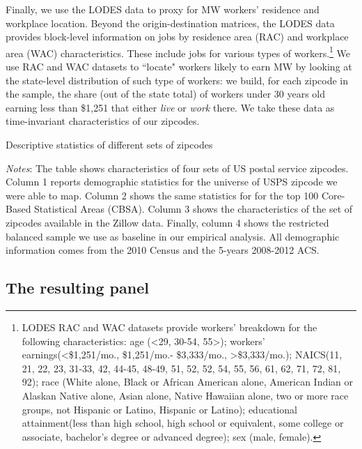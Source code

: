 Finally, we use the LODES data to proxy for MW workers' residence and workplace location. 
Beyond the origin-destination matrices, the LODES data provides block-level information on 
jobs by residence area (RAC) and workplace area (WAC) characteristics. These include jobs 
for various types of workers.\footnote{LODES RAC and WAC datasets provide workers' breakdown 
	for the following characteristics: age (<29, 30-54, 55>); workers' earnings(<\$1,251/mo., \$1,251/mo.-
	\$3,333/mo., >\$3,333/mo.); NAICS(11, 21, 22, 23, 31-33, 42, 44-45, 48-49, 51, 52, 52, 54, 55, 56, 
	61, 62, 71, 72, 81, 92); race (White alone, Black or African American alone, American Indian or Alaskan 
	Native alone, Asian alone, Native Hawaiian alone, two or more race groups, not Hispanic or Latino, 
	Hispanic or Latino); educational attainment(less than high school, high school or equivalent, some 
	college or associate, bachelor's degree or advanced degree); sex (male, female).} 
We use RAC and WAC datasets to ``locate" workers likely 
to earn MW by looking at the state-level distribution of such type of workers: we build, for 
each zipcode in the sample, the share (out of the state total) of workers under 30 years 
old earning less than \$1,251 
that either \textit{live} or \textit{work} there. We take 
these data as time-invariant characteristics of our zipcodes.

\begin{table}[h!]
	\caption{Descriptive statistics of different sets of zipcodes}
	\centering
	\label{tab:desc_stats}    
	
	\begin{minipage}{0.95\textwidth} \footnotesize
		\vspace{3mm} 
		\textit{Notes}: The table shows characteristics of four sets of US postal service 
		zipcodes. Column 1 reports demographic statistics for the universe of USPS zipcode we 
		were able to map. Column 2 shows the same statistics for for the top 100 Core-Based 
		Statistical Areas (CBSA). Column 3 shows the characteristics of the set of zipcodes 
		available in the Zillow data. Finally, column 4 shows the restricted balanced sample 
		we use as baseline in our empirical analysis. All demographic information comes from 
		the 2010 Census and the 5-years 2008-2012 ACS.
	\end{minipage}
\end{table}


\subsection{The resulting panel}

